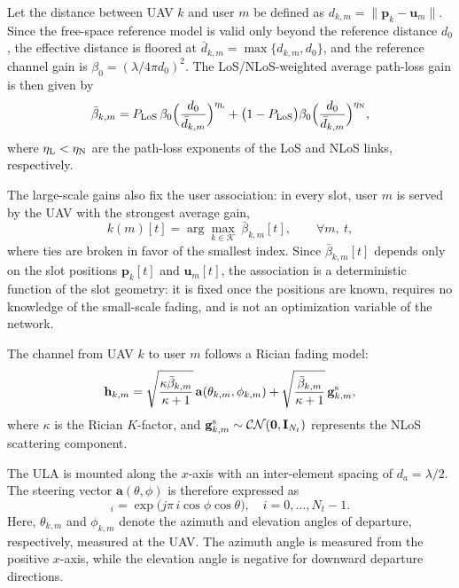 \documentclass[conference]{IEEEtran}
\begin{document}
Let the distance between UAV $k$ and user $m$ be defined as $d_{k,m}=\|\mathbf p_k-\mathbf u_m\|$. Since the free-space reference model is valid only beyond the reference distance $d_0$, the effective distance is floored at $\bar d_{k,m}=\max\{d_{k,m},d_0\}$, and the reference channel gain is $\beta_0=(\lambda/4\pi d_0)^2$. The LoS/NLoS-weighted average path-loss gain is then given by
\begin{equation}
\bar\beta_{k,m}=P_{\rm LoS}\,\beta_0\Big(\frac{d_0}{\bar d_{k,m}}\Big)^{\eta_{\rm L}} +\big(1-P_{\rm LoS}\big)\beta_0\Big(\frac{d_0}{\bar d_{k,m}}\Big)^{\eta_{\rm N}},
\end{equation}
where $\eta_{\rm L}<\eta_{\rm N}$ are the path-loss exponents of the LoS and NLoS links, respectively.

The large-scale gains also fix the user association: in every slot, user $m$ is served by the UAV with the strongest average gain,
\begin{equation}\label{eq:assoc}
k(m)[t]=\arg\max_{k\in\mathcal K}\ \bar\beta_{k,m}[t],\qquad\forall m,\ t,
\end{equation}
where ties are broken in favor of the smallest index. Since $\bar\beta_{k,m}[t]$ depends only on the slot positions $\mathbf p_k[t]$ and $\mathbf u_m[t]$, the association is a deterministic function of the slot geometry: it is fixed once the positions are known, requires no knowledge of the small-scale fading, and is not an optimization variable of the network.

The channel from UAV $k$ to user $m$ follows a Rician fading model:
\begin{equation}
\mathbf h_{k,m}=\sqrt{\frac{\kappa\bar\beta_{k,m}}{\kappa+1}}\, \mathbf a(\theta_{k,m},\phi_{k,m}) +\sqrt{\frac{\bar\beta_{k,m}}{\kappa+1}}\,\mathbf g^{\rm s}_{k,m},
\end{equation}
where $\kappa$ is the Rician $K$-factor, and $\mathbf g^{\rm s}_{k,m}\sim\mathcal{CN}(\mathbf 0,\mathbf I_{N_t})$ represents the NLoS scattering component.

The ULA is mounted along the $x$-axis with an inter-element spacing of $d_a=\lambda/2$. The steering vector $\mathbf a(\theta,\phi)$ is therefore expressed as
\begin{equation}
[\mathbf a(\theta,\phi)]_i=\exp\!\big(j\pi\, i\cos\phi\cos\theta\big), \quad i=0,\dots,N_t-1.
\end{equation}
Here, $\theta_{k,m}$ and $\phi_{k,m}$ denote the azimuth and elevation angles of departure, respectively, measured at the UAV. The azimuth angle is measured from the positive $x$-axis, while the elevation angle is negative for downward departure directions. 
\end{document}
